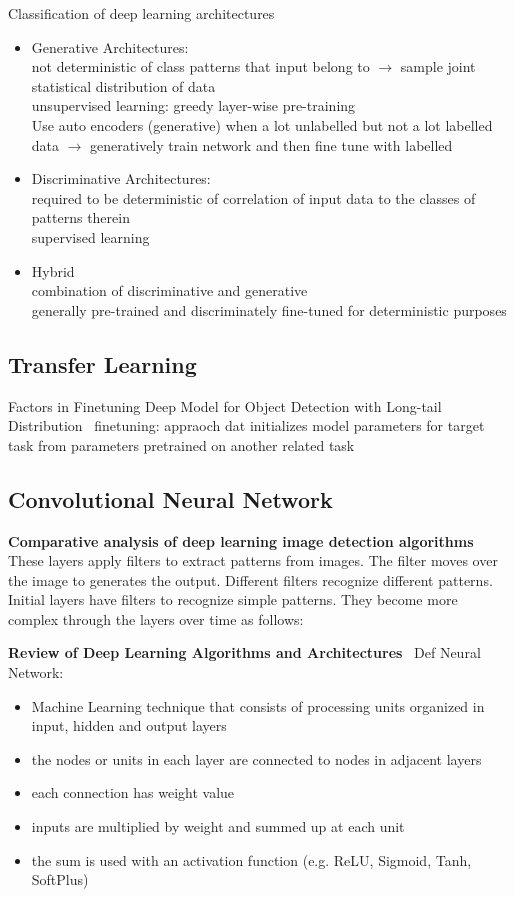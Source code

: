 Classification of deep learning architectures
\begin{itemize}
    \item Generative Architectures:\\
        not deterministic of class patterns that input belong to $\rightarrow$ sample joint
        statistical distribution of data\\
        unsupervised learning: greedy layer-wise pre-training\\
        Use auto encoders (generative) when a lot unlabelled but not a lot labelled data
        $\rightarrow$ generatively train network and then fine tune with labelled
    \item Discriminative Architectures:\\
        required to be deterministic of correlation of input data to the classes of patterns therein\\
        supervised learning
    \item Hybrid\\
        combination of discriminative and generative\\
        generally pre-trained and discriminately fine-tuned for deterministic purposes
\end{itemize}

\subsection*{Transfer Learning}
Factors in Finetuning Deep Model for Object Detection with Long-tail
Distribution~\citep{ouyang_factors_2016}
finetuning: appraoch dat initializes model parameters for target task from parameters pretrained on
another related task

\subsection*{Convolutional Neural Network}
\textbf{Comparative analysis of deep learning image detection
algorithms}~\citep{srivastava_comparative_2021}
These layers apply filters to extract patterns from images. The filter moves over the image to generates the output. Different filters recognize different patterns. Initial layers have filters to recognize simple patterns. They become more complex through the layers over time as follows:

\textbf{Review of Deep Learning Algorithms and Architectures}~\citep{shrestha_review_2019}
Def Neural Network:
\begin{itemize}
    \item Machine Learning technique that consists of processing units organized in input,
        hidden and output layers
    \item the nodes or units in each layer are connected to nodes in adjacent layers
    \item each connection has weight value
    \item inputs are multiplied by weight and summed up at each unit
    \item the sum is used with an activation function (e.g. ReLU, Sigmoid, Tanh, SoftPlus)
\end{itemize}

